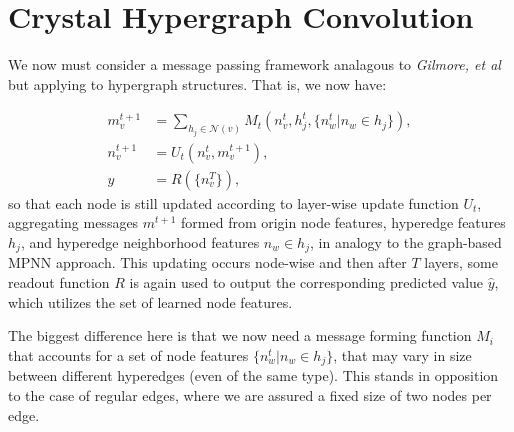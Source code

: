\documentclass[10pt,a4paper]{article}
\begin{document}

\section{Crystal Hypergraph Convolution}

We now must consider a message passing framework analagous to \textit{Gilmore, et al} \cite{mpnn} but applying to hypergraph structures. That is, we now have:

\begin{align*}
m_v^{t+1}&=\sum_{h_j\in \mathcal{N}(v)} M_t(n_v^{t},h_j^{t},\lbrace n_w^t \vert n_w \in h_j \rbrace),\\
n_v^{t+1}&=U_t(n_v^t,m_v^{t+1}),\\
\hat{y}&=R(\lbrace n_v^T\rbrace),
\end{align*}
so that each node is still updated according to layer-wise update function $U_t$, aggregating messages $m^{t+1}$ formed from origin node features, hyperedge features $h_j$, and hyperedge neighborhood features $n_w \in h_j$, in analogy to the graph-based MPNN approach. This updating occurs node-wise and then after $T$ layers, some readout function $R$ is again used to output the corresponding predicted value $\hat{y}$, which utilizes the set of learned node features.


  
The biggest difference here is that we now need a message forming function $M_i$ that accounts for a set of node features $\lbrace n_w^t \vert n_w \in h_j \rbrace$, that may vary in size between different hyperedges (even of the same type). This stands in opposition to the case of regular edges, where we are assured a fixed size of two nodes per edge. 
\end{document}
